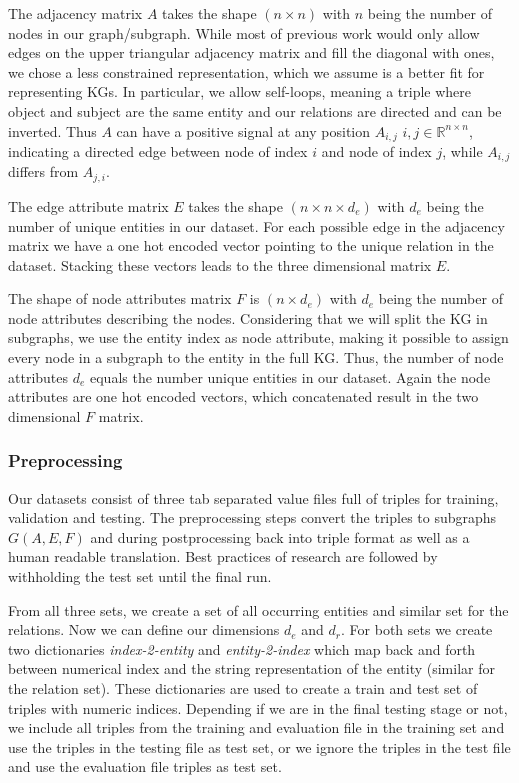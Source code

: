 The adjacency matrix $A$ takes the shape $(n\times n)$ with $n$ being the number of nodes in our graph/subgraph. While most of previous work would only allow edges on the upper triangular adjacency matrix and fill the diagonal with ones, we chose a less constrained representation, which we assume is a better fit for representing KGs. In particular, we allow self-loops, meaning a triple where object and subject are the same entity and our relations are directed and can be inverted. Thus $A$ can have a positive signal at any position $A_{i,j}$  $i,j \in \mathbb{R}^{n \times n}$, indicating a directed edge between node of index $i$ and node of index $j$, while $A_{i,j}$ differs from $A_{j,i}$.

The edge attribute matrix $E$ takes the shape $(n\times n\times d_e)$ with $d_e$ being the number of unique entities in our dataset. For each possible edge in the adjacency matrix we have a one hot encoded vector pointing to the unique relation in the dataset. Stacking these vectors leads to the three dimensional matrix $E$.

The shape of node attributes matrix $F$ is $(n\times d_e)$ with $d_e$ being the number of node attributes describing the nodes. Considering that we will split the KG in subgraphs, we use the entity index as node attribute, making it possible to assign every node in a subgraph to the entity in the full KG. Thus, the number of node attributes $d_e$ equals the number unique entities in our dataset. Again the node attributes are one hot encoded vectors, which concatenated result in the two dimensional $F$ matrix.


\subsubsection{Preprocessing}
Our datasets consist of three tab separated value files full of triples for training, validation and testing. The preprocessing steps convert the triples to subgraphs $G(A,E,F)$ and during postprocessing back into triple format as well as a human readable translation. Best practices of research are followed by withholding the test set until the final run.

From all three sets, we create a set of all occurring entities and similar set for the relations. Now we can define our dimensions $d_e$ and $d_r$. For both sets we create two dictionaries \textit{index-2-entity} and \textit{entity-2-index}  which map back and forth between numerical index and the string representation of the entity (similar for the relation set). These dictionaries are used to create a train and test set of triples with numeric indices. Depending if we are in the final testing stage or not, we include all triples from the training and evaluation file in the training set and use the triples in the testing file as test set, or we ignore the triples in the test file and use the evaluation file triples as test set.

